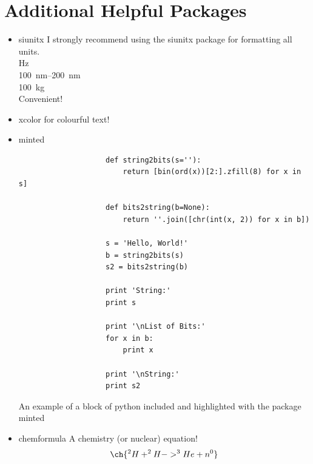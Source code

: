 \documentclass[hidelinks, 12pt]{article}%
\begin{document}
    \section{Additional Helpful Packages}
        \begin{itemize}
        \item siunitx
            I strongly recommend using the siunitx package for formatting all units.
            \\\si{\hertz}
            \\\SIrange{100}{200}{\nano\meter}
            \\\SI{100}{\kilo\gram}
            \\Convenient!
        \item xcolor
            for {\color{red}colourful} {\color{blue}text}!

        \item minted
            \begin{listing}[H]
                \begin{verbatim}
                    def string2bits(s=''):
                        return [bin(ord(x))[2:].zfill(8) for x in s]

                    def bits2string(b=None):
                        return ''.join([chr(int(x, 2)) for x in b])

                    s = 'Hello, World!'
                    b = string2bits(s)
                    s2 = bits2string(b)

                    print 'String:'
                    print s

                    print '\nList of Bits:'
                    for x in b:
                        print x

                    print '\nString:'
                    print s2
                \end{verbatim}
                \caption{An example of a block of python included and highlighted with the package minted}
                \label{lst:pythonExample}
            \end{listing}

        \item chemformula
            A chemistry (or nuclear) equation!
            \begin{equation}
                \ch{
                ^{2}H + ^{2}H -> ^{3}He + n^{0}
                }
                \label{eqt:nucEnerReleased}
            \end{equation}
            \end{itemize}
\end{document}
